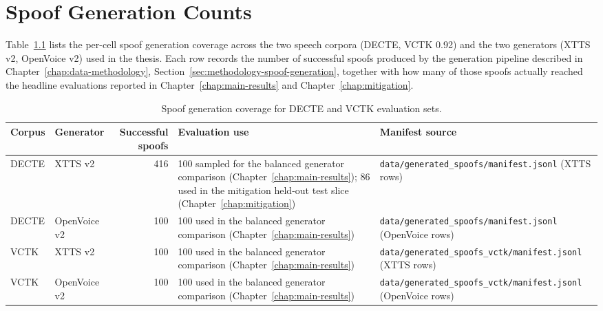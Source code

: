 \cleardoubleoddpage
\chapter{Spoof Generation Counts}
\label{app:spoof-generation-counts}

Table~\ref{tab:appendix-spoof-generation-coverage} lists the per-cell
spoof generation coverage across the two speech corpora (DECTE, VCTK
0.92) and the two generators (XTTS v2, OpenVoice v2) used in the
thesis. Each row records the number of successful spoofs produced by
the generation pipeline described in Chapter~\ref{chap:data-methodology},
Section~\ref{sec:methodology-spoof-generation}, together with how many
of those spoofs actually reached the headline evaluations reported in
Chapter~\ref{chap:main-results} and Chapter~\ref{chap:mitigation}.

\begin{table}[t]
\centering
\caption{Spoof generation coverage for DECTE and VCTK evaluation sets.}
\label{tab:appendix-spoof-generation-coverage}
\scriptsize
\setlength{\tabcolsep}{3pt}
\begin{tabularx}{\linewidth}{@{}l l r X X@{}}
\toprule
\textbf{Corpus} & \textbf{Generator} & \textbf{Successful spoofs} & \textbf{Evaluation use} & \textbf{Manifest source} \\
\midrule
DECTE & XTTS v2      & 416 & 100 sampled for the balanced generator comparison (Chapter~\ref{chap:main-results}); 86 used in the mitigation held-out test slice (Chapter~\ref{chap:mitigation}) & \texttt{data/generated\_spoofs/}\allowbreak\texttt{manifest.jsonl} (XTTS rows) \\
DECTE & OpenVoice v2 & 100 & 100 used in the balanced generator comparison (Chapter~\ref{chap:main-results}) & \texttt{data/generated\_spoofs/}\allowbreak\texttt{manifest.jsonl} (OpenVoice rows) \\
VCTK  & XTTS v2      & 100 & 100 used in the balanced generator comparison (Chapter~\ref{chap:main-results}) & \texttt{data/generated\_spoofs\_vctk/}\allowbreak\texttt{manifest.jsonl} (XTTS rows) \\
VCTK  & OpenVoice v2 & 100 & 100 used in the balanced generator comparison (Chapter~\ref{chap:main-results}) & \texttt{data/generated\_spoofs\_vctk/}\allowbreak\texttt{manifest.jsonl} (OpenVoice rows) \\
\bottomrule
\end{tabularx}
\end{table}
